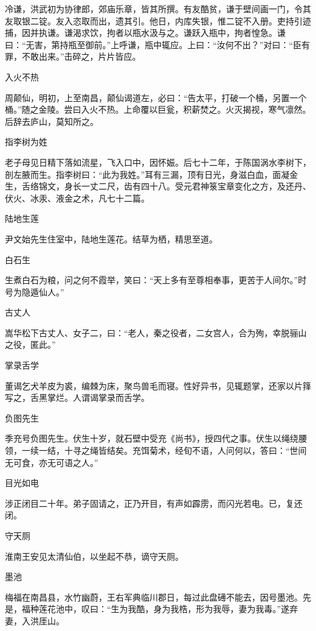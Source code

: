 \documentclass[a4paper,12pt,UTF8,twoside]{ctexbook}
\begin{document}
    冷谦，洪武初为协律郎，郊庙乐章，皆其所撰。有友酷贫，谦于壁间画一门，令其友取银二锭。友入恣取而出，遗其引。他日，内库失银，惟二锭不入册。吏持引迹捕，因并执谦。谦渴求饮，拘者以瓶水汲与之。谦跃入瓶中，拘者惶急。谦曰：“无害，第持瓶至御前。”上呼谦，瓶中辄应。上曰：“汝何不出？”对曰：“臣有罪，不敢出来。”击碎之，片片皆应。
    
    入火不热
    
    周颠仙，明初，上至南昌，颠仙谒道左，必曰：“告太平，打破一个桶，另置一个桶。”随之金陵。尝曰入火不热。上命覆以巨瓮，积薪焚之。火灭揭视，寒气凛然。后辞去庐山，莫知所之。
    
    指李树为姓
    
    老子母见日精下落如流星，飞入口中，因怀娠。后七十二年，于陈国涡水李树下，剖左腋而生。指李树曰：“此为我姓。”耳有三漏，顶有日光，身滋白血，面凝金生，舌络锦文，身长一丈二尺，齿有四十八。受元君神箓宝章变化之方，及还丹、伏火、冰汞、液金之术，凡七十二篇。
    
    陆地生莲
    
    尹文始先生住室中，陆地生莲花。结草为栖，精思至道。
    
    白石生
    
    生煮白石为粮，问之何不霞举，笑曰：“天上多有至尊相奉事，更苦于人间尔。”时号为隐遁仙人。”
    
    古丈人
    
    嵩华松下古丈人、女子二，曰：“老人，秦之役者，二女宫人，合为殉，幸脱骊山之役，匿此。”
    
    掌录舌学
    
    董谒乞犬羊皮为裘，编棘为床，聚鸟兽毛而寝。性好异书，见辄题掌，还家以片箨写之，舌黑掌烂。人谓谒掌录而舌学。
    
    负图先生
    
    季充号负图先生。伏生十岁，就石壁中受充《尚书》，授四代之事。伏生以绳绕腰领，一续一结，十寻之绳皆结矣。充饵菊术，经旬不语，人问何以，答曰：“世间无可食，亦无可语之人。”
    
    目光如电
    
    涉正闭目二十年。弟子固请之，正乃开目，有声如霹雳，而闪光若电。已，复还闭。
    
    守天厕
    
    淮南王安见太清仙伯，以坐起不恭，谪守天厕。
    
    墨池
    
    梅福在南昌县，水竹幽蔚，王右军典临川郡日，每过此盘礡不能去，因号墨池。先是，福种莲花池中，叹曰：“生为我酷，身为我梏，形为我辱，妻为我毒。”遂弃妻，入洪厓山。
    
\end{document}
